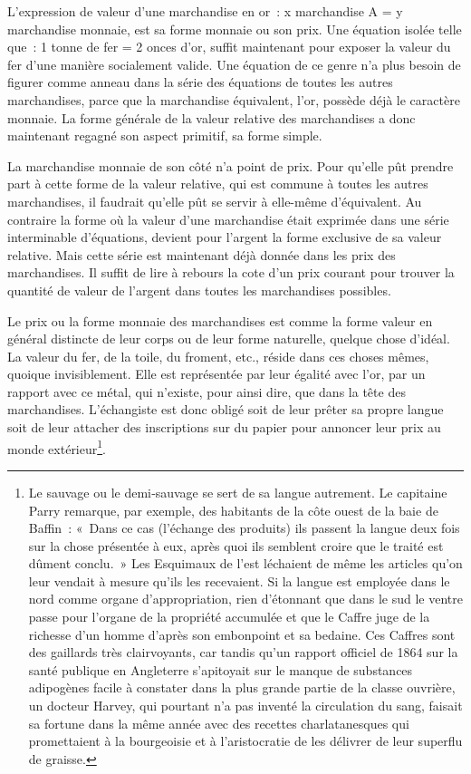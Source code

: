 \documentclass[french,twoside]{book} %
\begin{document}
L’expression de valeur d’une marchandise en or : x marchandise A = y marchandise monnaie, est sa forme monnaie ou son prix. Une équation isolée telle que : 1 tonne de fer = 2 onces d’or, suffit maintenant pour exposer la valeur du fer d’une manière socialement valide. Une équation de ce genre n’a plus besoin de figurer comme anneau dans la série des équations de toutes les autres marchandises, parce que la marchandise équivalent, l’or, possède déjà le caractère monnaie. La forme générale de la valeur relative des marchandises a donc maintenant regagné son aspect primitif, sa forme simple.\par
La marchandise monnaie de son côté n’a point de prix. Pour qu’elle pût prendre part à cette forme de la valeur relative, qui est commune à toutes les autres marchandises, il faudrait qu’elle pût se servir à elle-même d’équivalent. Au contraire la forme où la valeur d’une marchandise était exprimée dans une série interminable d’équations, devient pour l’argent la forme exclusive de sa valeur relative. Mais cette série est maintenant déjà donnée dans les prix des marchandises. Il suffit de lire à rebours la cote d’un prix courant pour trouver la quantité de valeur de l’argent dans toutes les marchandises possibles.\par
Le prix ou la forme monnaie des marchandises est comme la forme valeur en général distincte de leur corps ou de leur forme naturelle, quelque chose d’idéal. La valeur du fer, de la toile, du froment, etc., réside dans ces choses mêmes, quoique invisiblement. Elle est représentée par leur égalité avec l’or, par un rapport avec ce métal, qui n’existe, pour ainsi dire, que dans la tête des marchandises. L’échangiste est donc obligé soit de leur prêter sa propre langue soit de leur attacher des inscriptions sur du papier pour annoncer leur prix au monde extérieur\footnote{Le sauvage ou le demi‑sauvage se sert de sa langue autrement. Le capitaine Parry remarque, par exemple, des habitants de la côte ouest de la baie de Baffin : « Dans ce cas (l’échange des produits) ils passent la langue deux fois sur la chose présentée à eux, après quoi ils semblent croire que le traité est dûment conclu. » Les Esquimaux de l’est léchaient de même les articles qu’on leur vendait à mesure qu’ils les recevaient. Si la langue est employée dans le nord comme organe d’appropriation, rien d’étonnant que dans le sud le ventre passe pour l’organe de la propriété accumulée et que le Caffre juge de la richesse d’un homme d’après son embonpoint et sa bedaine. Ces Caffres sont des gaillards très clairvoyants, car tandis qu’un rapport officiel de 1864 sur la santé publique en Angleterre s’apitoyait sur le manque de substances adipogènes facile à constater dans la plus grande partie de la classe ouvrière, un docteur Harvey, qui pourtant n’a pas inventé la circulation du sang, faisait sa fortune dans la même année avec des recettes charlatanesques qui promettaient à la bourgeoisie et à l’aristocratie de les délivrer de leur superflu de graisse.}.\par
\end{document}

